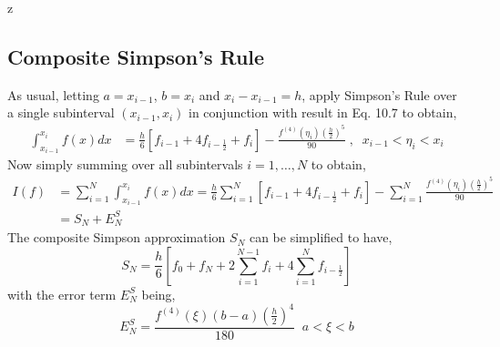 z\documentclass[a4paper,12pt,twoside]{book}
\begin{document}
\subsection{Composite Simpson's Rule}
As usual, letting $a = x_{i-1}$, $b=x_i$ and $x_i - x_{i-1} = h$, apply Simpson's Rule over a single subinterval $(x_{i-1},x_i)$ in conjunction with result in Eq. 10.7 to obtain,
\begin{equation*}
\begin{split}
    \int_{x_{i-1}}^{x_i} f(x)dx &= \frac{h}{6} \left[ f_{i-1} + 4f_{i-\frac{1}{2}} + f_i \right] - \frac{f^{(4)}(\eta_i)\left( \frac{h}{2}\right)^5}{90}\;,\;\;x_{i-1} < \eta_i < x_i
\end{split}
\end{equation*}
Now simply summing over all subintervals $i=1,\dots,N$ to obtain,
\begin{equation}
    \begin{split}
        I(f) &= \sum_{i=1}^N \int_{x_{i-1}}^{x_i} f(x)dx = \frac{h}{6} \sum_{i=1}^N \left[ f_{i-1} + 4f_{i-\frac{1}{2}} + f_i \right] - \sum_{i=1}^N\frac{f^{(4)}(\eta_i)\left( \frac{h}{2}\right)^5}{90}\\
        &= S_N + E_N^S
    \end{split}
\end{equation}
The composite Simpson approximation $S_N$ can be simplified to have,
\begin{equation}
    \boxed{S_N = \frac{h}{6}\left[ f_0 + f_N + 2\sum_{i=1}^{N-1}f_i + 4\sum_{i=1}^N f_{i-\frac{1}{2}} \right]}
\end{equation}
with the error term $E_N^S$ being,
\begin{equation}
    E_N^S = \frac{f^{(4)}(\xi)(b-a)\left(\frac{h}{2}\right)^4}{180} \;\; a<\xi<b
\end{equation}
\end{document}
